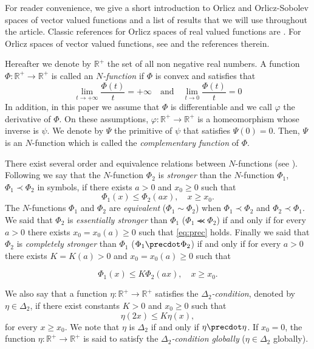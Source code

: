 \documentclass[twoside]{article}
\theoremstyle{remark}
\renewcommand{\leq}{\leqslant}
\renewcommand{\geq}{\geqslant}
\begin{document}
For reader convenience, we give a short introduction to Orlicz and Orlicz-Sobolev spaces of vector valued functions and a  list  of results that we will use throughout the article. 
Classic references for Orlicz spaces of real valued functions are \cite{adams_sobolev,KR,rao1991theory}.
For  Orlicz spaces of vector valued functions, see \cite{Orliczvectorial2005} and the references therein.

Hereafter we denote  by $\mathbb{R}^+$  the set of all non negative real numbers. A function $\Phi:\mathbb{R}^+\to \mathbb{R}^+ $ is called an \emph{$N$-function} if $\Phi$ is convex and satisfies that
\[
\lim_{t\to+\infty}\frac{\Phi(t)}{t}=+\infty\quad\text{and}\quad \lim_{t\to 0}\frac{\Phi(t)}{t}=0
\]
In addition,  in this paper  we assume that $\Phi$ is differentiable and we call $\varphi$  the derivative of $\Phi$. 
On these assumptions, $\varphi:\mathbb{R}^+\rightarrow \mathbb{R}^+$ is a homeomorphism whose inverse is $\psi$. 
We denote by $\Psi$ the primitive of $\psi$ that satisfies $\Psi(0)=0$. Then, $\Psi$ is an $N$-function which  is called the \emph{complementary function} of $\Phi$.


There exist several order and equivalence relations between $N$-functions (see \cite[Sec. 2.2]{rao1991theory}).
Following \cite[Def. 1, p. 15-16]{rao1991theory} we say that the   $N$-function $\Phi_2$ is \emph{stronger} than the $N$-function  $\Phi_1$,   $\Phi_1\prec\Phi_2$ in symbols, if  there exists $a>0$ and $x_0\geq 0$ such that
\begin{equation}\label{eq:prec}\Phi_1(x)\leq \Phi_2(ax), \quad x\geq x_0.\end{equation}
 The $N$-functions  $\Phi_1$ and   $\Phi_2$ are \emph{equivalent} ($\Phi_1\sim\Phi_2$)  when  $\Phi_1\prec\Phi_2$ and $\Phi_2\prec\Phi_1$.
We said that  $\Phi_2$ is \emph{essentially stronger} than  $\Phi_1$  ($\Phi_1\llcurly\Phi_2$) if and only if for every $a>0$ there exists $x_0=x_0(a)\geq 0$ such that \eqref{eq:prec} holds. Finally we said that  $\Phi_2$ is \emph{completely stronger} than  $\Phi_1$  ($\Phi_1\precdot\Phi_2$) if and only if for every $a>0$ there exists $K=K(a)>0$ and  $x_0=x_0(a)\geq 0$ such that

\begin{equation}\label{eq:prec2}\Phi_1(x)\leq K\Phi_2(ax), \quad x\geq x_0.\end{equation}


We also say that a function $\eta:\mathbb{R}^+\rightarrow \mathbb{R}^+$ satisfies the  \emph{$\Delta_2$-condition}, denoted by $\eta \in \Delta_2$,
if there exist  constants $K>0$ and  $x_0\geq 0$ such that
\begin{equation}\label{delta2defi}\eta(2x)\leq K\eta(x),
\end{equation}
for every $x\geq x_0$. We note that $\eta$ is $\Delta_2$ if and only if $\eta\precdot\eta$.
If $x_0=0$,  the function   $\eta:\mathbb{R}^+\rightarrow \mathbb{R}^+$ is said to satisfy the \emph{$\Delta_2$-condition globally} ($\eta \in \Delta_2$ globally).
\end{document}
